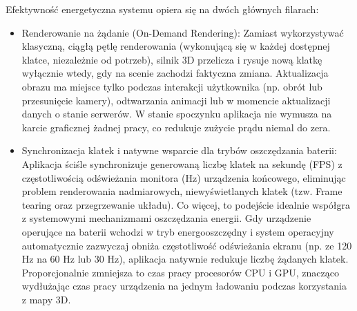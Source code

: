 Efektywność energetyczna systemu opiera się na dwóch głównych filarach:
\begin{itemize}
    \item Renderowanie na żądanie (On-Demand Rendering): Zamiast wykorzystywać klasyczną, ciągłą pętlę renderowania (wykonującą się w każdej dostępnej klatce, niezależnie od potrzeb), silnik 3D przelicza i rysuje nową klatkę wyłącznie wtedy, gdy na scenie zachodzi faktyczna zmiana. Aktualizacja obrazu ma miejsce tylko podczas interakcji użytkownika (np. obrót lub przesunięcie kamery), odtwarzania animacji lub w momencie aktualizacji danych o stanie serwerów. W stanie spoczynku aplikacja nie wymusza na karcie graficznej  żadnej pracy, co redukuje zużycie prądu niemal do zera.
    \item Synchronizacja klatek i natywne wsparcie dla trybów oszczędzania baterii: Aplikacja ściśle synchronizuje generowaną liczbę klatek na sekundę (FPS) z częstotliwością odświeżania monitora (Hz) urządzenia końcowego, eliminując problem renderowania nadmiarowych, niewyświetlanych klatek (tzw. \gls{Frame tearing} oraz przegrzewanie układu). Co więcej, to podejście idealnie współgra z systemowymi mechanizmami oszczędzania energii. Gdy urządzenie operujące na baterii wchodzi w tryb energooszczędny i system operacyjny automatycznie zazwyczaj obniża częstotliwość odświeżania ekranu (np. ze 120 Hz na 60 Hz lub 30 Hz), aplikacja natywnie redukuje liczbę żądanych klatek. Proporcjonalnie zmniejsza to czas pracy procesorów CPU i GPU, znacząco wydłużając czas pracy urządzenia na jednym ładowaniu podczas korzystania z mapy 3D.
\end{itemize}

